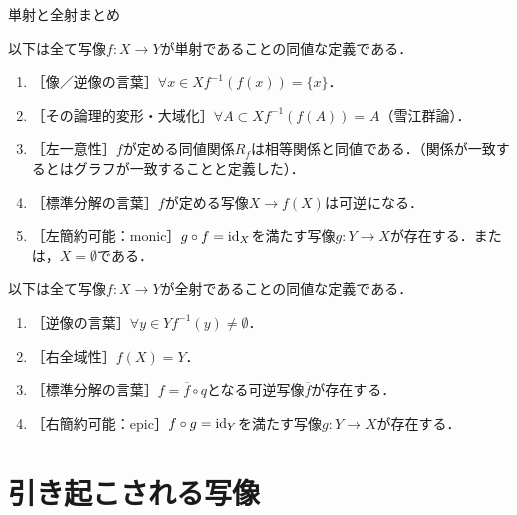 \documentclass[uplatex,dvipdfmx]{jsreport}
\begin{document}
\begin{itembox}[l]{単射と全射まとめ}
    \begin{theorem}[mono]
        以下は全て写像$f:X\to Y$が単射であることの同値な定義である．
        \begin{enumerate}
            \item ［像／逆像の言葉］$\forall x\in X f^{-1}(f(x))=\{x\}$．
            \item ［その論理的変形・大域化］$\forall A\subset X f^{-1}(f(A))=A$（雪江群論）．
            \item ［左一意性］$f$が定める同値関係$R_f$は相等関係と同値である．（関係が一致するとはグラフが一致することと定義した）．
            \item ［標準分解の言葉］$f$が定める写像$X\to f(X)$は可逆になる．
            \item ［左簡約可能：monic］$g\circ f=\mathrm{id}_X$を満たす写像$g:Y\to X$が存在する．または，$X=\emptyset$である．
        \end{enumerate}
    \end{theorem}
    \begin{theorem}[epi]
        以下は全て写像$f:X\to Y$が全射であることの同値な定義である．
        \begin{enumerate}
            \item ［逆像の言葉］$\forall y\in Y f^{-1}(y)\ne\emptyset$．
            \item ［右全域性］$f(X)=Y$．
            \item ［標準分解の言葉］$f=\overline{f}\circ q$となる可逆写像$\overline{f}$が存在する．
            \item ［右簡約可能：epic］$f\circ g=\mathrm{id}_Y$を満たす写像$g:Y\to X$が存在する．
        \end{enumerate}
    \end{theorem}
\end{itembox}

\section{引き起こされる写像}
\end{document}
